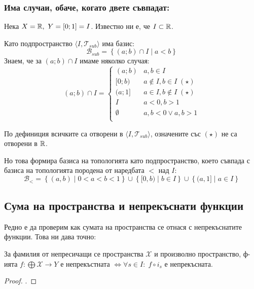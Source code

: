 \subsubsection*{Има случаи, обаче, когато двете съвпадат:}
\begin{example}
    Нека $X = {\mathbb{R}},\ Y = [0; 1] = I$. Известно ни е, че $I \subset {\mathbb{R}}$.

    Като подпространство $\langle I, \mathcal T_{sub}\rangle$ има базис:
    \begin{equation}
        \mathcal B_{sub} = \left\{(a; b) \cap I\mid a < b\right\}
    \end{equation}
    Знаем, че за $(a; b) \cap I$ имаме няколко случая:
    \begin{equation}
        (a; b) \cap I = \begin{cases}
            (a; b)      & a, b \in I \\
            [0; b)      & a \notin I, b \in I\; (\star)\\
            (a; 1]      & a \in I, b \notin I\; (\star)\\
            I           & a < 0, b > 1 \\
            \emptyset   & a, b < 0 \lor a, b > 1 \\
        \end{cases}
    \end{equation}

    По дефиниция всичките са отворени в $\langle I, \mathcal T_{sub} \rangle$, означените със $(\star)$ не са отворени в ${\mathbb{R}}$. 
    
    Но това формира базиса на топологията като подпространство, което съвпада с базиса на топологията породена от наредбата $<$ над $I$:
    \begin{equation}
         \mathcal B_< = \left\{(a,b) \mid 0 < a < b < 1\right\} \cup \left\{ [0, b) \mid b \in I \right\} \cup \left\{ (a, 1] \mid a \in I \right\}
    \end{equation}
\end{example}

\subsection{Сума на пространства и непрекъснати функции}
Редно е да проверим как сумата на пространства се отнася с непрекъснатите функции. Това ни дава точно:
\begin{theorem}
    За фамилия от непресичащи се пространства $\mathcal X$ и произволно пространство, ф-ията $f : \bigoplus \mathcal X \to Y$ е непрекъстната $\iff \forall s \in I:\; f \circ  i_s$ е непрекъсната.
\end{theorem}
\begin{proof}
    \cite[p.~75]{engelking1989general}.
\end{proof}

